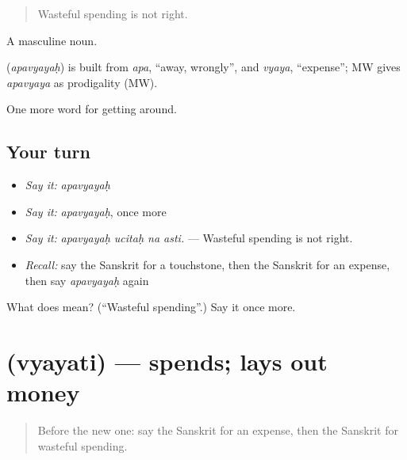 \begin{quote}
Wasteful spending is not right.
\end{quote}

A masculine noun.

\begin{cousinweb}
\textbf{} (\emph{apavyayaḥ}) is built from \emph{apa}, \textquotedblleft{}away, wrongly\textquotedblright{}, and \emph{vyaya}, \textquotedblleft{}expense\textquotedblright{}; MW gives \emph{apavyaya} as prodigality (MW).
\end{cousinweb}

\begin{grammarlens}[title={What you've built}]
One more word for getting around.
\end{grammarlens}

\subsection*{Your turn}
\begin{itemize}
\raggedright
  \item \emph{Say it:} \emph{apavyayaḥ}
  \item \emph{Say it:} \emph{apavyayaḥ}, once more
  \item \emph{Say it:} \emph{apavyayaḥ ucitaḥ na asti.} — Wasteful spending is not right.
  \item \emph{Recall:} say the Sanskrit for a touchstone, then the Sanskrit for an expense, then say \emph{apavyayaḥ} again
\end{itemize}

\begin{tcolorbox}[breakable,colback=teal!4,colframe=teal!35!black,title={Before you move on}]
What does  mean? (\textquotedblleft{}Wasteful spending\textquotedblright{}.) Say it once more.
\end{tcolorbox}
\section[\texorpdfstring{\sk{व्ययति} (vyayati)}{व्ययति (vyayati)}]{ (vyayati) — spends; lays out money}

\label{lesson:SA-C432-vyayati}



\begin{quote}
Before the new one: say the Sanskrit for an expense, then the Sanskrit for wasteful spending.
\end{quote}

